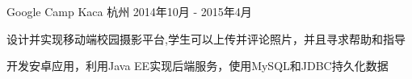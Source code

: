 \cventry
{Google Camp} %
{Kaca} %
{杭州} %
{2014年10月 - 2015年4月} %
{ %
\begin{cvitems}
    \item {设计并实现移动端校园摄影平台,学生可以上传并评论照片，并且寻求帮助和指导}
    \item {开发安卓应用，利用Java EE实现后端服务，使用MySQL和JDBC持久化数据}    
\end{cvitems}
}
